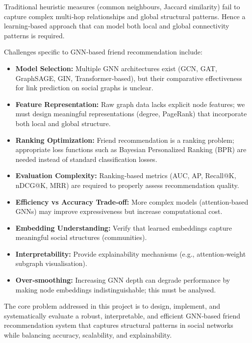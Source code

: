 \documentclass[conference]{IEEEtran}
\begin{document}
Traditional heuristic measures (common neighbours, Jaccard similarity) fail to capture complex multi‑hop relationships and global structural patterns. Hence a learning‑based approach that can model both local and global connectivity patterns is required.

Challenges specific to GNN‑based friend recommendation include:
\begin{itemize}
  \item \textbf{Model Selection:} Multiple GNN architectures exist (GCN, GAT, GraphSAGE, GIN, Transformer‑based), but their comparative effectiveness for link prediction on social graphs is unclear.
  \item \textbf{Feature Representation:} Raw graph data lacks explicit node features; we must design meaningful representations (degree, PageRank) that incorporate both local and global structure.
  \item \textbf{Ranking Optimization:} Friend recommendation is a ranking problem; appropriate loss functions such as Bayesian Personalized Ranking (BPR) are needed instead of standard classification losses.
  \item \textbf{Evaluation Complexity:} Ranking‑based metrics (AUC, AP, Recall@K, nDCG@K, MRR) are required to properly assess recommendation quality.
  \item \textbf{Efficiency vs Accuracy Trade‑off:} More complex models (attention‑based GNNs) may improve expressiveness but increase computational cost.
  \item \textbf{Embedding Understanding:} Verify that learned embeddings capture meaningful social structures (communities).
  \item \textbf{Interpretability:} Provide explainability mechanisms (e.g., attention‑weight subgraph visualisation).
  \item \textbf{Over‑smoothing:} Increasing GNN depth can degrade performance by making node embeddings indistinguishable; this must be analysed.
\end{itemize}

The core problem addressed in this project is to design, implement, and systematically evaluate a robust, interpretable, and efficient GNN‑based friend recommendation system that captures structural patterns in social networks while balancing accuracy, scalability, and explainability.
\end{document}
